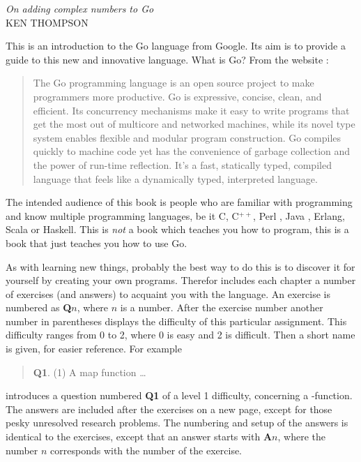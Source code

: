 {\textit{On adding complex numbers to Go}\\ \textsc{KEN THOMPSON}}

\noindent{}This is an introduction to the Go language from Google. Its aim
is to provide a guide to this new and innovative language. What is
Go? From the website \cite{go_web}:
\begin{quote}
The Go programming language is an open source project to make
programmers more productive. Go is expressive, concise, clean, and
efficient. Its concurrency mechanisms make it easy to write programs
that get the most out of multicore and networked machines, while its
novel type system enables flexible and modular program construction. Go
compiles quickly to machine code yet has the convenience of garbage
collection and the power of run-time reflection. It's a fast, statically
typed, compiled language that feels like a dynamically typed,
interpreted language.
\end{quote}

The intended audience of this book is people who are familiar with programming
and know multiple programming languages, be it C\cite{c}, C$^{++}$\cite{c++}, 
Perl \cite{perl}, Java \cite{java}, Erlang\cite{erlang}, Scala\cite{scala} or
Haskell\cite{haskell}. This is \emph{not} a book which teaches you how to 
program, this is a book that just teaches you how to use Go.

As with
learning new things, probably the best way to do this is to discover it for
yourself by creating your own programs.
Therefor includes each chapter a number of exercises (and answers)
to acquaint you with the language.
An exercise
is numbered as \textbf{Q$n$}, where $n$ is a number. After the
exercise number another number in parentheses displays the difficulty
of this particular assignment. This difficulty ranges from 0 to
2, where 0 is easy and 2 is difficult. 
Then a short name is given, for easier reference.
For example
\begin{verse}
\textbf{Q1}. (1) A map function \ldots
\end{verse}
    
introduces a question numbered \textbf{Q1} of a level 1 difficulty, concerning a
-function. The answers are included after the exercises on a
new page, except for those pesky unresolved research problems.
The numbering and setup of the answers is identical to the
exercises, except that an answer starts with \textbf{A$n$}, where the
number $n$ corresponds with the number of the exercise.

